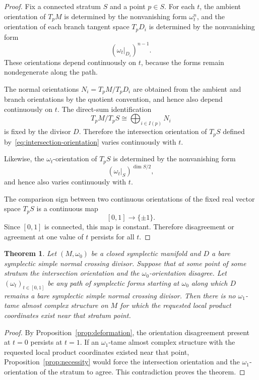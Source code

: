 \documentclass[12pt]{article}
\newtheorem{theorem}{Theorem}[section]
\begin{document}
\begin{proof}
Fix a connected stratum \(S\) and a point \(p\in S\). For each \(t\), the ambient orientation of \(T_pM\) is determined by the nonvanishing form \(\omega_t^n\), and the orientation of each branch tangent space \(T_pD_i\) is determined by the nonvanishing form
\[
(\omega_t|_{D_i})^{n-1}.
\]
These orientations depend continuously on \(t\), because the forms remain nondegenerate along the path.

The normal orientations \(N_i=T_pM/T_pD_i\) are obtained from the ambient and branch orientations by the quotient convention, and hence also depend continuously on \(t\). The direct-sum identification
\[
T_pM/T_pS\cong\bigoplus_{i\in I(p)} N_i
\]
is fixed by the divisor \(D\). Therefore the intersection orientation of \(T_pS\) defined by~\eqref{eq:intersection-orientation} varies continuously with \(t\).

Likewise, the \(\omega_t\)-orientation of \(T_pS\) is determined by the nonvanishing form
\[
(\omega_t|_S)^{\dim S/2},
\]
and hence also varies continuously with \(t\).

The comparison sign between two continuous orientations of the fixed real vector space \(T_pS\) is a continuous map
\[
[0,1]\longrightarrow\{\pm1\}.
\]
Since \([0,1]\) is connected, this map is constant. Therefore disagreement or agreement at one value of \(t\) persists for all \(t\).
\end{proof}

\begin{theorem}\label{thm:obstruction}
Let \((M,\omega_0)\) be a closed symplectic manifold and \(D\) a bare symplectic simple normal crossing divisor. Suppose that at some point of some stratum the intersection orientation and the \(\omega_0\)-orientation disagree. Let \((\omega_t)_{t\in[0,1]}\) be any path of symplectic forms starting at \(\omega_0\) along which \(D\) remains a bare symplectic simple normal crossing divisor. Then there is no \(\omega_1\)-tame almost complex structure on \(M\) for which the requested local product coordinates exist near that stratum point.
\end{theorem}

\begin{proof}
By Proposition~\ref{prop:deformation}, the orientation disagreement present at \(t=0\) persists at \(t=1\). If an \(\omega_1\)-tame almost complex structure with the requested local product coordinates existed near that point, Proposition~\ref{prop:necessity} would force the intersection orientation and the \(\omega_1\)-orientation of the stratum to agree. This contradiction proves the theorem.
\end{proof}
\end{document}
